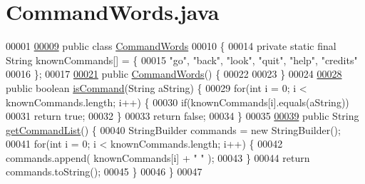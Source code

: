 \hypertarget{CommandWords_8java_source}{\section{Command\-Words.\-java}
}

\begin{DoxyCode}
00001 
\hypertarget{CommandWords_8java_source_l00009}{}\hyperlink{classCommandWords}{00009} \textcolor{keyword}{public} \textcolor{keyword}{class }\hyperlink{classCommandWords}{CommandWords}
00010 \{
00014     \textcolor{keyword}{private} \textcolor{keyword}{static} \textcolor{keyword}{final} String knownCommands[] = \{
00015         \textcolor{stringliteral}{"go"}, \textcolor{stringliteral}{"back"}, \textcolor{stringliteral}{"look"}, \textcolor{stringliteral}{"quit"}, \textcolor{stringliteral}{"help"}, \textcolor{stringliteral}{"credits"}
00016     \};
00017 
\hypertarget{CommandWords_8java_source_l00021}{}\hyperlink{classCommandWords_a2d8c096723adb3f822cc001bccd92ed7}{00021}     \textcolor{keyword}{public} \hyperlink{classCommandWords_a2d8c096723adb3f822cc001bccd92ed7}{CommandWords}() \{
00022 
00023     \}
00024 
\hypertarget{CommandWords_8java_source_l00028}{}\hyperlink{classCommandWords_a98619d278b3fa23fed18b5834f9d20a8}{00028}     \textcolor{keyword}{public} \textcolor{keywordtype}{boolean} \hyperlink{classCommandWords_a98619d278b3fa23fed18b5834f9d20a8}{isCommand}(String aString) \{
00029         \textcolor{keywordflow}{for}(\textcolor{keywordtype}{int} i = 0; i < knownCommands.length; i++) \{
00030             \textcolor{keywordflow}{if}(knownCommands[i].equals(aString))
00031                 \textcolor{keywordflow}{return} \textcolor{keyword}{true};
00032         \}
00033         \textcolor{keywordflow}{return} \textcolor{keyword}{false};
00034     \}
00035 
\hypertarget{CommandWords_8java_source_l00039}{}\hyperlink{classCommandWords_aa26f54985e39543739e0ae291dcdb8f1}{00039}     \textcolor{keyword}{public} String \hyperlink{classCommandWords_aa26f54985e39543739e0ae291dcdb8f1}{getCommandList}() \{
00040         StringBuilder commands = \textcolor{keyword}{new} StringBuilder();
00041         \textcolor{keywordflow}{for}(\textcolor{keywordtype}{int} i = 0; i < knownCommands.length; i++) \{
00042             commands.append( knownCommands[i] + \textcolor{stringliteral}{"  "} );
00043         \}
00044         \textcolor{keywordflow}{return} commands.toString();
00045     \}
00046 \}
00047 
\end{DoxyCode}
